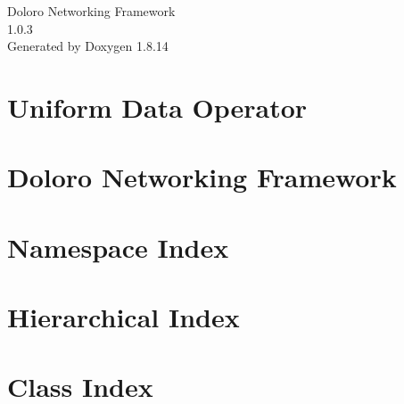 \documentclass[twoside]{book}
\newcommand{\+}{\discretionary{\mbox{\scriptsize$\hookleftarrow$}}{}{}}
\newcommand{\clearemptydoublepage}{%
  \newpage{\pagestyle{empty}\cleardoublepage}%
}
\begin{document}
\hypersetup{pageanchor=false,
             bookmarksnumbered=true,
             pdfencoding=unicode
            }
\begin{titlepage}
\vspace*{7cm}
\begin{center}%
{\Large Doloro Networking Framework \\[1ex]\large 1.\+0.\+3 }\\
\vspace*{1cm}
{\large Generated by Doxygen 1.8.14}\\
\end{center}
\end{titlepage}
\clearemptydoublepage
{}
\tableofcontents
\clearemptydoublepage
{}
\hypersetup{pageanchor=true}

\chapter{Uniform Data Operator}
\label{md__d_1__work__git_hub_doloro-networking-framework__addons_uniform-data-operator__r_e_a_d_m_e}

\chapter{Doloro Networking Framework}
\label{md__d_1__work__git_hub_doloro-networking-framework__r_e_a_d_m_e}

\chapter{Namespace Index}

\chapter{Hierarchical Index}

\chapter{Class Index}

\end{document}

